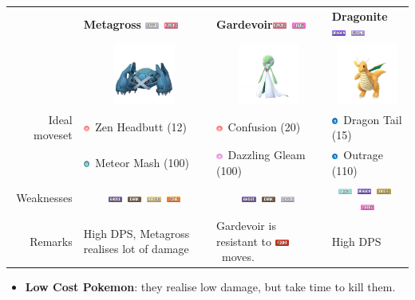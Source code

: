 \documentclass[12pt]{beamer}
\newcommand{\fightingfull}{\includegraphics[height=0.2cm]{../../images/type/full/Fighting.png}}
\newcommand{\darkfull}{\includegraphics[height=0.2cm]{../../images/type/full/Dark.png}}
\newcommand{\fairyfull}{\includegraphics[height=0.2cm]{../../images/type/full/Fairy.png}}
\newcommand{\firefull}{\includegraphics[height=0.2cm]{../../images/type/full/Fire.png}}
\newcommand{\flyingfull}{\includegraphics[height=0.2cm]{../../images/type/full/Flying.png}}
\newcommand{\ghostfull}{\includegraphics[height=0.2cm]{../../images/type/full/Ghost.png}}
\newcommand{\dragonfull}{\includegraphics[height=0.2cm]{../../images/type/full/Dragon.png}}
\newcommand{\groundfull}{\includegraphics[height=0.2cm]{../../images/type/full/Ground.png}}
\newcommand{\icefull}{\includegraphics[height=0.2cm]{../../images/type/full/Ice.png}}
\newcommand{\psychicfull}{\includegraphics[height=0.2cm]{../../images/type/full/Psychic.png}}
\newcommand{\rockfull}{\includegraphics[height=0.2cm]{../../images/type/full/Rock.png}}
\newcommand{\steelfull}{\includegraphics[height=0.2cm]{../../images/type/full/Steel.png}}
\newcommand{\dragonsimp}{\includegraphics[height=0.2cm]{../../images/type/simplified/dragon.png}}
\newcommand{\psysimp}{\includegraphics[height=0.2cm]{../../images/type/simplified/psy.png}}
\newcommand{\steelsimp}{\includegraphics[height=0.2cm]{../../images/type/simplified/steel.png}}
\newcommand{\fairysimp}{\includegraphics[height=0.2cm]{../../images/type/simplified/fairy.png}}
\begin{document}
\begin{frame}
\begin{block}{}
\begin{footnotesize}
\begin{center}
\begin{tabular}{rp{3.2cm}p{3.2cm}p{3.2cm}}
& \textbf{Metagross} \hfill \steelfull~\psychicfull &  \textbf{Gardevoir}\hfill \psychicfull~\fairyfull & \textbf{Dragonite} \hfill \dragonfull~\flyingfull \\ 
&\multicolumn{1}{c}{\includegraphics[width=2cm]{../../images/pokemon/Metagross}} &
\multicolumn{1}{c}{\includegraphics[width=2cm]{../../images/pokemon/Gardevoir}} &
\multicolumn{1}{c}{\includegraphics[width=2cm]{../../images/pokemon/Dragonite}}   \\ \hline
Ideal moveset &  \psysimp~Zen Headbutt (12) & \psysimp~Confusion (20) &  \dragonsimp~Dragon Tail (15)\\ 
&\steelsimp~Meteor Mash (100) & \fairysimp~Dazzling Gleam (100) & \dragonsimp~Outrage (110)  \\ \hline
Weaknesses & \multicolumn{1}{c}{\ghostfull~\darkfull~\groundfull~\firefull} & \multicolumn{1}{c}{\ghostfull~\darkfull~\steelfull} & \multicolumn{1}{c}{\icefull~\dragonfull~\rockfull~\fairyfull}  \\ \hline
Remarks & High DPS, Metagross realises lot of damage & Gardevoir is resistant to \fightingfull~moves. & High DPS \\ 
\end{tabular}
\end{center}

\begin{itemize}
  \item \textbf{Low Cost Pokemon}: they realise low damage, but take time to kill them.
\end{itemize}


\end{footnotesize}
\end{block}
\end{frame}
\end{document}
